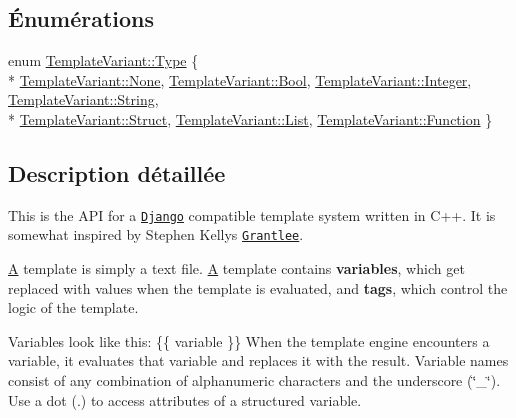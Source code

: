 \subsection*{Énumérations}
\begin{DoxyCompactItemize}
\item 
enum \hyperlink{group__template__api_ga4c0d322ba971480bfbd2a8f418eadc81}{Template\+Variant\+::\+Type} \{ \\*
\hyperlink{group__template__api_gga4c0d322ba971480bfbd2a8f418eadc81ac64bfef699f6847ca4a1589b5057a943}{Template\+Variant\+::\+None}, 
\hyperlink{group__template__api_gga4c0d322ba971480bfbd2a8f418eadc81aaa4ac74b26768c0a9aae405dc0ab4291}{Template\+Variant\+::\+Bool}, 
\hyperlink{group__template__api_gga4c0d322ba971480bfbd2a8f418eadc81af502b2f0adb48b330d54c141ab7d6b17}{Template\+Variant\+::\+Integer}, 
\hyperlink{group__template__api_gga4c0d322ba971480bfbd2a8f418eadc81a97c566900c9dce7f38cb2c1fd9e6890d}{Template\+Variant\+::\+String}, 
\\*
\hyperlink{group__template__api_gga4c0d322ba971480bfbd2a8f418eadc81a95bec7591d52d9a3e93851d6cb6f3064}{Template\+Variant\+::\+Struct}, 
\hyperlink{group__template__api_gga4c0d322ba971480bfbd2a8f418eadc81a06b8f56fd37b6285112638c331f29252}{Template\+Variant\+::\+List}, 
\hyperlink{group__template__api_gga4c0d322ba971480bfbd2a8f418eadc81afa78594f4b9f7fa93f71ef39deae0323}{Template\+Variant\+::\+Function}
 \}
\end{DoxyCompactItemize}


\subsection{Description détaillée}
This is the A\+P\+I for a \href{https://docs.djangoproject.com/en/1.6/topics/templates/}{\tt Django} compatible template system written in C++. It is somewhat inspired by Stephen Kelly\textquotesingle{}s \href{http://www.gitorious.org/grantlee/pages/Home}{\tt Grantlee}.

\hyperlink{class_a}{A} template is simply a text file. \hyperlink{class_a}{A} template contains {\bfseries variables}, which get replaced with values when the template is evaluated, and {\bfseries tags}, which control the logic of the template.

Variables look like this\+: {\ttfamily \{\{ variable \}\}} When the template engine encounters a variable, it evaluates that variable and replaces it with the result. Variable names consist of any combination of alphanumeric characters and the underscore (\char`\"{}\+\_\+\char`\"{}). Use a dot (.) to access attributes of a structured variable.

